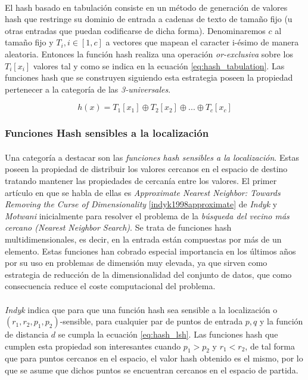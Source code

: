 \documentclass{subfiles}
\begin{document}
          \paragraph{}
          El hash basado en tabulación consiste en un método de generación de valores hash que restringe su dominio de entrada a cadenas de texto de tamaño fijo (u otras entradas que puedan codificarse de dicha forma). Denominaremos $c$ al tamaño fijo y  $T_i, i \in [1,c]$ a vectores que mapean el caracter i-ésimo de manera aleatoria. Entonces la función hash realiza una operación \emph{or-exclusiva} sobre los $T_i[x_i]$ valores tal y como se indica en la ecuación \eqref{eq:hash_tabulation}. Las funciones hash que se construyen siguiendo esta estrategia poseen la propiedad pertenecer a la categoría de las \emph{3-universales}.

          \begin{equation}
          \label{eq:hash_tabulation}
            h(x) = T_1[x_1] \oplus T_2[x_2] \oplus ... \oplus T_c[x_c]
          \end{equation}

      \subsubsection{Funciones Hash sensibles a la localización}
      \label{sec:hash_lsh}

        \paragraph{}
        Una categoría a destacar son las \emph{funciones hash sensibles a la localización}. Estas poseen la propiedad de distribuir los valores cercanos en el espacio de destino tratando mantener las propiedades de cercanía entre los valores. El primer artículo en que se habla de ellas es \emph{Approximate Nearest Neighbor: Towards Removing the Curse of Dimensionality} \ref{indyk1998approximate} de \emph{Indyk} y \emph{Motwani} inicialmente para resolver el problema de la \emph{búsqueda del vecino más cercano (Nearest Neighbor Search)}. Se trata de funciones hash multidimensionales, es decir, en la entrada están compuestas por más de un elemento. Estas funciones han cobrado especial importancia en los últimos años por su uso en problemas de dimensión muy elevada, ya que sirven como estrategia de reducción de la dimensionalidad del conjunto de datos, que como consecuencia reduce el coste computacional del problema.

        \paragraph{}
        \emph{Indyk} indica que para que una función hash sea sensible a la localización o $(r_1,r_2, p_1, p_2)$-sensible, para cualquier par de puntos de entrada $p,q$ y la función de distancia $d$ se cumpla la ecuación \eqref{eq:hash_lsh}. Las funciones hash que cumplen esta propiedad son interesantes cuando $p_1 > p_2$ y $r_1 < r_2$, de tal forma que para puntos cercanos en el espacio, el valor hash obtenido es el mismo, por lo que se asume que dichos puntos se encuentran cercanos en el espacio de partida.
\end{document}
